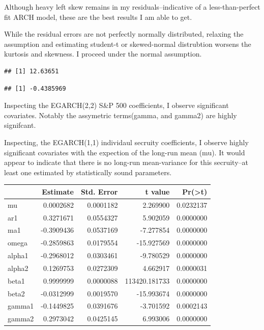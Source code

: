 \documentclass[]{elsarticle} %
\newenvironment{Shaded}{\begin{snugshade}}{\end{snugshade}}
\newcommand{\KeywordTok}[1]{\textcolor[rgb]{0.13,0.29,0.53}{\textbf{{#1}}}}
\newcommand{\NormalTok}[1]{{#1}}
\begin{document}
Although heavy left skew remains in my residuals--indicative of a
less-than-perfect fit ARCH model, these are the best results I am able
to get.

While the residual errors are not perfectly normally distributed,
relaxing the assumption and estimating student-t or skewed-normal
distrubtion worsens the kurtosis and skewness. I proceed under the
normal assumption.

\begin{Shaded}
\end{Shaded}

\begin{verbatim}
## [1] 12.63651
\end{verbatim}

\begin{Shaded}
\end{Shaded}

\begin{verbatim}
## [1] -0.4385969
\end{verbatim}

Inspecting the EGARCH(2,2) S\&P 500 coefficients, I observe significant
covariates. Notably the assymetric terms(gamma, and gamma2) are highly
signifcant.

Inspecting, the EGARCH(1,1) individaul secruity coefficients, I observe
highly significant covariates with the expection of the long-run mean
(mu). It would appear to indicate that there is no long-run
mean-variance for this secruity--at least one estimated by statistically
sound parameters.

\begin{longtable}[c]{@{}lrrrr@{}}
\toprule
& Estimate & Std. Error & t value &
Pr(\textgreater{}\textbar{}t\textbar{})\tabularnewline
\midrule
\endhead
mu & 0.0002682 & 0.0001182 & 2.269900 & 0.0232137\tabularnewline
ar1 & 0.3271671 & 0.0554327 & 5.902059 & 0.0000000\tabularnewline
ma1 & -0.3909436 & 0.0537169 & -7.277854 & 0.0000000\tabularnewline
omega & -0.2859863 & 0.0179554 & -15.927569 & 0.0000000\tabularnewline
alpha1 & -0.2968012 & 0.0303461 & -9.780529 & 0.0000000\tabularnewline
alpha2 & 0.1269753 & 0.0272309 & 4.662917 & 0.0000031\tabularnewline
beta1 & 0.9999999 & 0.0000088 & 113420.181733 & 0.0000000\tabularnewline
beta2 & -0.0312999 & 0.0019570 & -15.993674 & 0.0000000\tabularnewline
gamma1 & -0.1449825 & 0.0391676 & -3.701592 & 0.0002143\tabularnewline
gamma2 & 0.2973042 & 0.0425145 & 6.993006 & 0.0000000\tabularnewline
\bottomrule
\end{longtable}
\end{document}
